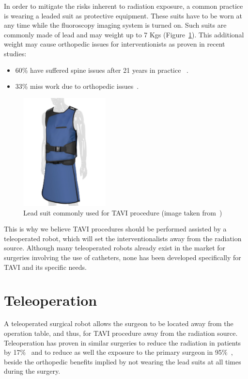 In order to mitigate the risks inherent to radiation exposure, a common practice is wearing a leaded suit as protective equipment. These suits have to be worn at any time while the fluoroscopy imaging system is turned on. Such suits are commonly made of lead and may weight up to 7 Kgs (Figure~\ref{img:leadvest}). This additional weight may cause orthopedic issues for interventionists as proven in recent studies:
\begin{itemize}
 \item  60\% have suffered spine issues after 21 years in practice ~\cite{tavihazards}.
 \item 	33\% miss work due to orthopedic issues~\cite{tavimissed}.\\
\end{itemize}

\begin{figure}[ht]
   \centering
   \includegraphics[width=0.4\textwidth]{img/leadvest.PNG}
   \caption{Lead suit commonly used for TAVI procedure (image taken from~\protect\cite{tavivest})}
   \label{img:leadvest}
\end{figure}

This is why we believe TAVI procedures should be performed assisted by a teleoperated robot, which will set the interventionalists away from the radiation source. Although many teleoperated robots already exist in the market for surgeries involving the use of catheters, none has been developed specifically for TAVI and its specific needs.\\
\clearpage

\section{Teleoperation}\label{sec:teleoperation}

A teleoperated surgical robot allows the surgeon to be located away from the operation table, and thus, for TAVI procedure away from the radiation source. Teleoperation has proven in similar surgeries to reduce the radiation in patients by 17\%~\cite{pci} and to reduce as well the exposure to the primary surgeon in 95\%~\cite{pcisafety}, beside the orthopedic benefits implied by not wearing the lead suits at all times during the surgery.\\

